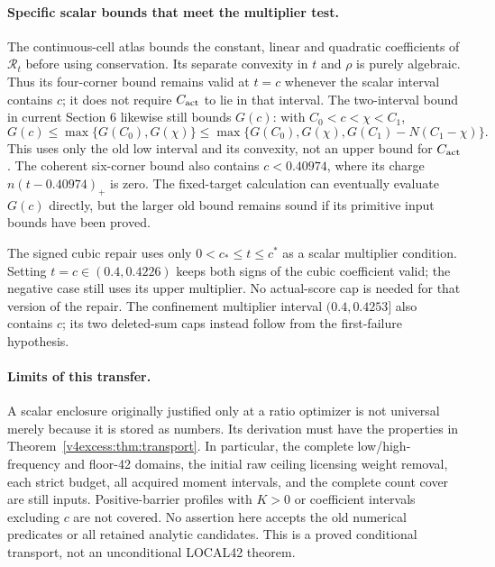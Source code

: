 \paragraph{Specific scalar bounds that meet the multiplier test.}
The continuous-cell atlas bounds the constant, linear and quadratic
coefficients of $\mathcal R_t$ before using conservation. Its separate
convexity in $t$ and $\rho$ is purely algebraic. Thus its four-corner
bound remains valid at $t=c$ whenever the scalar interval contains $c$;
it does not require $C_{\rm act}$ to lie in that interval.
The two-interval bound in current Section 6 likewise still bounds
$G(c)$: with $C_0<c<\chi<C_1$,
\[
 G(c)\le\max\{G(C_0),G(\chi)\}
 \le\max\{G(C_0),G(\chi),G(C_1)-N(C_1-\chi)\}.
\]
This uses only the old low interval and its convexity, not an upper
bound for $C_{\rm act}$. The coherent six-corner bound also contains
$c<0.40974$, where its charge $n(t-0.40974)_+$ is zero. The fixed-target
calculation can eventually evaluate $G(c)$ directly, but the larger old
bound remains sound if its primitive input bounds have been proved.

The signed cubic repair uses only $0<c_*\le t\le c^*$ as a scalar
multiplier condition. Setting $t=c\in(0.4,0.4226)$ keeps both signs of
the cubic coefficient valid; the negative case still uses its upper
multiplier. No actual-score cap is needed for that version of the repair.
The confinement multiplier interval $(0.4,0.4253]$ also contains $c$;
its two deleted-sum caps instead follow from the first-failure hypothesis.

\paragraph{Limits of this transfer.}
A scalar enclosure originally justified only at a ratio optimizer is
not universal merely because it is stored as numbers. Its derivation
must have the properties in Theorem~\ref{v4excess:thm:transport}. In particular,
the complete low/high-frequency and floor-42 domains, the initial raw
ceiling licensing weight removal, each strict budget, all acquired
moment intervals, and the complete count cover are still inputs.
Positive-barrier profiles with $K>0$ or coefficient intervals excluding
$c$ are not covered. No assertion here accepts the old numerical
predicates or all retained analytic candidates. This is a proved
conditional transport, not an unconditional LOCAL42 theorem.

